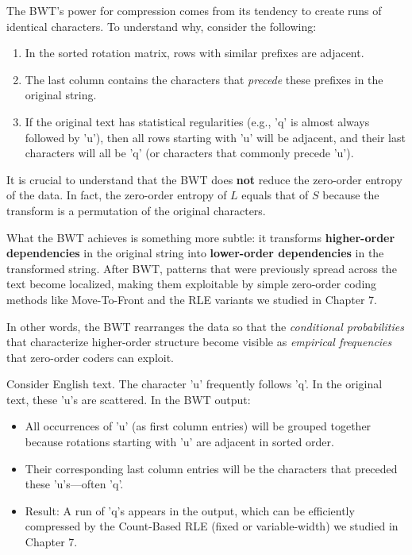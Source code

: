 The BWT's power for compression comes from its tendency to create runs of identical characters. To understand why, consider the following:

\begin{enumerate}
    \item In the sorted rotation matrix, rows with similar prefixes are adjacent.
    \item The last column contains the characters that \emph{precede} these prefixes in the original string.
    \item If the original text has statistical regularities (e.g., 'q' is almost always followed by 'u'), then all rows starting with 'u' will be adjacent, and their last characters will all be 'q' (or characters that commonly precede 'u').
\end{enumerate}

\begin{importantbox}
It is crucial to understand that the BWT does \textbf{not} reduce the zero-order entropy of the data. In fact, the zero-order entropy of \(L\) equals that of \(S\) because the transform is a permutation of the original characters.

What the BWT achieves is something more subtle: it transforms \textbf{higher-order dependencies} in the original string into \textbf{lower-order dependencies} in the transformed string. After BWT, patterns that were previously spread across the text become localized, making them exploitable by simple zero-order coding methods like Move-To-Front and the RLE variants we studied in Chapter 7.

In other words, the BWT rearranges the data so that the \emph{conditional probabilities} that characterize higher-order structure become visible as \emph{empirical frequencies} that zero-order coders can exploit.
\end{importantbox}

\begin{examplebox}
Consider English text. The character 'u' frequently follows 'q'. In the original text, these 'u's are scattered. In the BWT output:
\begin{itemize}
    \item All occurrences of 'u' (as first column entries) will be grouped together because rotations starting with 'u' are adjacent in sorted order.
    \item Their corresponding last column entries will be the characters that preceded these 'u's—often 'q'.
    \item Result: A run of 'q's appears in the output, which can be efficiently compressed by the Count-Based RLE (fixed or variable-width) we studied in Chapter 7.
\end{itemize}
\end{examplebox}

